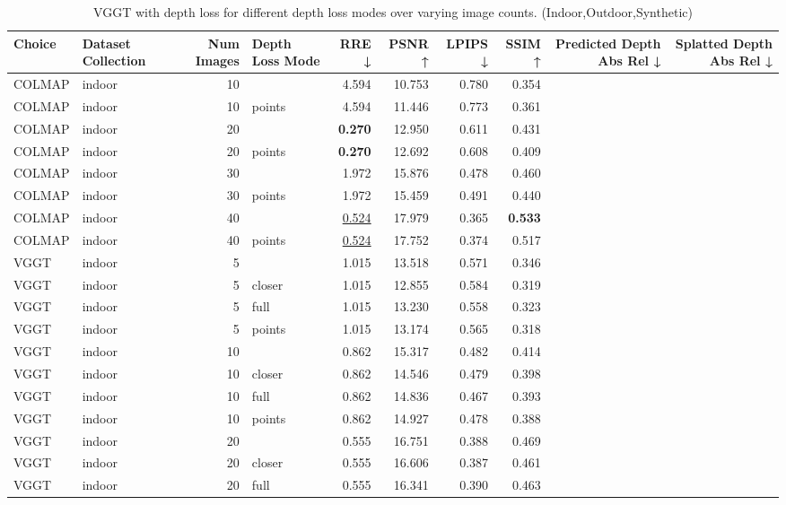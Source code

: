 \begin{table}[H]
\caption{VGGT with depth loss for different depth loss modes over varying image counts. (Indoor,Outdoor,Synthetic)}
\label{tab:05_depth_loss_num_images_indoor,outdoor,synthetic}
\centering
\scriptsize
\begin{tabular}{llrlrrrrrr}
\toprule
Choice & Dataset Collection & Num Images & Depth Loss Mode & RRE ↓ & PSNR ↑ & LPIPS ↓ & SSIM ↑ & Predicted Depth Abs Rel ↓ & Splatted Depth Abs Rel ↓ \\
\midrule
COLMAP & indoor & 10 &  & 4.594 & 10.753 & 0.780 & 0.354 &  &  \\
COLMAP & indoor & 10 & points & 4.594 & 11.446 & 0.773 & 0.361 &  &  \\
COLMAP & indoor & 20 &  & \textbf{0.270} & 12.950 & 0.611 & 0.431 &  &  \\
COLMAP & indoor & 20 & points & \textbf{0.270} & 12.692 & 0.608 & 0.409 &  &  \\
COLMAP & indoor & 30 &  & 1.972 & 15.876 & 0.478 & 0.460 &  &  \\
COLMAP & indoor & 30 & points & 1.972 & 15.459 & 0.491 & 0.440 &  &  \\
COLMAP & indoor & 40 &  & \underline{0.524} & 17.979 & 0.365 & \textbf{0.533} &  &  \\
COLMAP & indoor & 40 & points & \underline{0.524} & 17.752 & 0.374 & 0.517 &  &  \\
VGGT & indoor & 5 &  & 1.015 & 13.518 & 0.571 & 0.346 &  &  \\
VGGT & indoor & 5 & closer & 1.015 & 12.855 & 0.584 & 0.319 &  &  \\
VGGT & indoor & 5 & full & 1.015 & 13.230 & 0.558 & 0.323 &  &  \\
VGGT & indoor & 5 & points & 1.015 & 13.174 & 0.565 & 0.318 &  &  \\
VGGT & indoor & 10 &  & 0.862 & 15.317 & 0.482 & 0.414 &  &  \\
VGGT & indoor & 10 & closer & 0.862 & 14.546 & 0.479 & 0.398 &  &  \\
VGGT & indoor & 10 & full & 0.862 & 14.836 & 0.467 & 0.393 &  &  \\
VGGT & indoor & 10 & points & 0.862 & 14.927 & 0.478 & 0.388 &  &  \\
VGGT & indoor & 20 &  & 0.555 & 16.751 & 0.388 & 0.469 &  &  \\
VGGT & indoor & 20 & closer & 0.555 & 16.606 & 0.387 & 0.461 &  &  \\
VGGT & indoor & 20 & full & 0.555 & 16.341 & 0.390 & 0.463 &  &  \\

\end{tabular}
\end{table}
